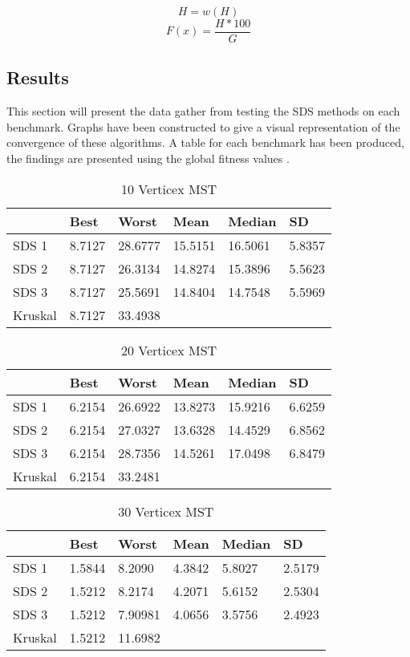 \documentclass{AISB2008}
\begin{document}
{\begin{equation}
H = w(H)
\end{equation}
\begin{equation}
F(x) = \frac{H * 100}{G}
\end{equation}


\subsection{Results}

This section will present the data gather from testing the SDS methods on each benchmark. Graphs have been constructed to give a visual representation of the convergence of these algorithms. A table for each benchmark has been produced, the findings are presented using the global fitness values .

\begin{table}
\centering
\caption{10 Verticex MST}
\begin{tabular}{l|lllll}
	   & Best    & Worst    &   Mean  & Median & SD \\ \hline
SDS 1  & 8.7127 & 28.6777 & 15.5151 & 16.5061 & 5.8357 \\
SDS 2  & 8.7127 & 26.3134 & 14.8274 & 15.3896 & 5.5623	\\
SDS 3  & 8.7127 & 25.5691 & 14.8404	& 14.7548 & 5.5969 \\
Kruskal &8.7127 & 33.4938 & 		&  & \\
\end{tabular}
\end{table}

\begin{table}
\centering
\caption{20 Verticex MST}
\begin{tabular}{l|lllll}
	   & Best    & Worst    &   Mean  & Median & SD \\ \hline
SDS 1  & 6.2154 & 26.6922 & 13.8273 & 15.9216	 & 6.6259	 \\
SDS 2  & 6.2154 & 27.0327 & 13.6328	 & 14.4529	 & 6.8562	\\
SDS 3  & 6.2154 & 28.7356	 & 14.5261	& 17.0498	 & 6.8479 \\
Kruskal &6.2154 & 33.2481 & 		&  & \\
\end{tabular}
\end{table}

\begin{table}
\centering
\caption{30 Verticex MST}
\begin{tabular}{l|lllll}
	   & Best    & Worst    &   Mean  & Median & SD \\ \hline
SDS 1  & 1.5844	&  8.2090 & 4.3842  & 5.8027 & 2.5179 \\
SDS 2  & 1.5212 & 8.2174 & 4.2071 & 5.6152 & 2.5304 \\
SDS 3  & 1.5212 & 7.90981 & 4.0656	& 3.5756 & 2.4923 \\
Kruskal &1.5212 & 11.6982 & 		&  & \\
\end{tabular}
\end{table}

}
\end{document}
